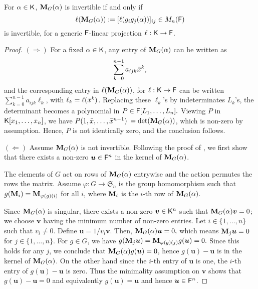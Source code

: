 \begin{lemma}
  \label{Lem:Proj}
  For $\alpha \in {\mathsf{K}}$, $\mat M_G(\alpha)$ is invertible if and only
  if $$\ell(\mat M_G(\alpha)) := [\ell(g_ig_j(\alpha))]_{ij} \in M_n(\F)$$
  is invertible, for a generic ${\mathsf{F}}$-linear projection $\ell: {\mathsf{K}} \to {\mathsf{F}}$.
\end{lemma}
\begin{proof}
  $(\Rightarrow)$ For a fixed $\alpha\in{\mathsf{K}}$, any entry of
  $\mat M_G(\alpha)$ can be written as
  \begin{equation}\label{Eq:PrimElm}
    \sum_{k= 0}^{n-1} a_{ijk}{\bar x}^k,
  \end{equation}
  and the corresponding entry in $\ell(\mat M_G(\alpha))$, for
  $\ell: {\mathsf{K}} \to {\mathsf{F}}$ can be written $\sum_{k= 0}^{n-1} a_{ijk}\ell_k$, with
  $\ell_k = \ell({\bar x}^k)$. Replacing these $\ell_k$'s by indeterminates
  $L_k$'s, the determinant becomes a polynomial in
  $P \in {\mathsf{F}}[L_1, \ldots, L_n].$ Viewing $P$ in ${\mathsf{K}}[x_1, \ldots , x_n]$, we
  have $ P(1, {\bar x}, \ldots, {\bar x}^{n-1})$ $= \det(\mat M_G(\alpha))$,
  which is non-zero by assumption. Hence, $P$ is not identically zero, and
  the conclusion follows.
  
  $(\Leftarrow)$ Assume $\mat M_G(\alpha)$ is not invertible. Following the
  proof of \cite[Lemma 4]{Jam18}, we first show that there exists a
  non-zero $\boldsymbol{u} \in {\mathsf{F}}^n$ in the kernel of $\mat M_G(\alpha)$.
  
  The elements of $G$ act on rows of $\mat M_G(\alpha)$ entrywise and the
  action permutes the rows the matrix. Assume
  $\varphi : G \to \mathfrak{S}_n$ is the group homomorphism such that
  $g(\mat M_i) = \mat M_{\varphi(g)(i)}$ for all $i$, where $\mat M_i$ is
  the $i$-th row of $\mat M_G(\alpha)$.
  
  Since $\mat M_G(\alpha)$ is singular, there exists a non-zero
  $\boldsymbol{v} \in {\mathsf{K}}^n$ such that $\mat M_G(\alpha)\boldsymbol{v} = 0$;
  we choose $\boldsymbol{v}$ having the minimum number of non-zero
  entries. Let $i \in \lbrace 1, \ldots , n \rbrace$ such that
  $v_i \neq 0$. Define $\boldsymbol{u} = 1/v_i\boldsymbol{v}$. Then,
  $\mat M_G(\alpha)\boldsymbol{u} = 0,$ which means
  $\mat M_j \boldsymbol{u} = 0 $ for $j \in \lbrace 1, \ldots, n
  \rbrace$. For $g \in G$, we have
  $g(\mat M_j \boldsymbol{u}) = \mat M_{\varphi(g)(j)} g(\boldsymbol{u})=
  0.$ Since this holds for any $j$, we conclude that
  $\mat M_G(\alpha)g(\boldsymbol{u})= 0$, hence
  $g(\boldsymbol{u})-\boldsymbol{u}$ is in the kernel of
  $\mat M_G(\alpha)$. On the other hand since the $i$-th entry of
  $\boldsymbol{u}$ is one, the $i$-th entry of
  $g(\boldsymbol{u}) -\boldsymbol{u}$ is zero. Thus the minimality
  assumption on $\textbf{v}$ shows that
  $g(\boldsymbol{u}) -\boldsymbol{u} = 0$ and equivalently
  $g(\boldsymbol{u})=\boldsymbol{u}$ and hence $\boldsymbol{u} \in {\mathsf{F}}^n$.
  

\end{proof}
